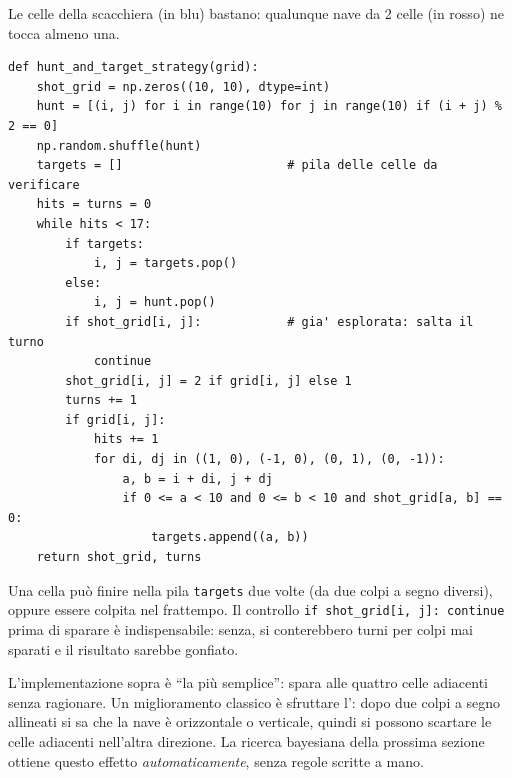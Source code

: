 \begin{center}
\end{center}
{\small\sffamily\color{grigio}\hspace*{\fill}Le celle della scacchiera (in blu) bastano:
qualunque nave da 2 celle (in rosso) ne tocca almeno una.\hspace*{\fill}}

\begin{lstlisting}
def hunt_and_target_strategy(grid):
    shot_grid = np.zeros((10, 10), dtype=int)
    hunt = [(i, j) for i in range(10) for j in range(10) if (i + j) % 2 == 0]
    np.random.shuffle(hunt)
    targets = []                       # pila delle celle da verificare
    hits = turns = 0
    while hits < 17:
        if targets:
            i, j = targets.pop()
        else:
            i, j = hunt.pop()
        if shot_grid[i, j]:            # gia' esplorata: salta il turno
            continue
        shot_grid[i, j] = 2 if grid[i, j] else 1
        turns += 1
        if grid[i, j]:
            hits += 1
            for di, dj in ((1, 0), (-1, 0), (0, 1), (0, -1)):
                a, b = i + di, j + dj
                if 0 <= a < 10 and 0 <= b < 10 and shot_grid[a, b] == 0:
                    targets.append((a, b))
    return shot_grid, turns
\end{lstlisting}

\begin{attenzione}
Una cella può finire nella pila \texttt{targets} due volte (da due colpi a segno diversi),
oppure essere colpita nel frattempo. Il controllo \texttt{if shot\_grid[i, j]: continue}
prima di sparare è indispensabile: senza, si conterebbero turni per colpi mai sparati e
il risultato sarebbe gonfiato.
\end{attenzione}

\begin{extra}
L'implementazione sopra è ``la più semplice'': spara alle quattro celle adiacenti senza
ragionare. Un miglioramento classico è sfruttare l': dopo due colpi a
segno allineati si sa che la nave è orizzontale o verticale, quindi si possono scartare
le celle adiacenti nell'altra direzione. La ricerca bayesiana della prossima sezione
ottiene questo effetto \emph{automaticamente}, senza regole scritte a mano.
\end{extra}

